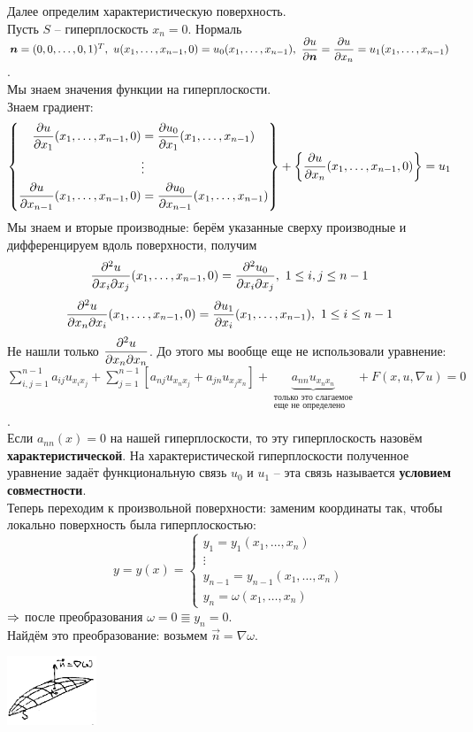 Далее определим характеристическую поверхность.\\
Пусть $S$ -- гиперплоскость $x_n = 0$. Нормаль $\boldsymbol{n} = (0,0,\dots,0, 1)^T,\ u(x_1, \dots, x_{n-1}, 0) = u_0(x_1, \dots, x_{n-1}),\ \dfrac{\partial u}{\partial\boldsymbol{n}} = \dfrac{\partial u}{\partial x_n} = u_1(x_1, \dots, x_{n-1}) $.\\
Мы знаем значения функции на гиперплоскости.\\
Знаем градиент:
\begin{equation*}
\left\{\begin{aligned}
\frac{\partial u}{\partial x_1}(x_1, \dots, x_{n-1}, 0) &= \frac{\partial u_0}{\partial x_1}(x_1, \dots, x_{n-1})\\ 
&\vdots \\
\frac{\partial u}{\partial x_{n-1}}(x_1, \dots, x_{n-1}, 0) &= \frac{\partial u_0}{\partial x_{n-1}}(x_1, \dots, x_{n-1})
\end{aligned} \right\}
+\left\{\frac{\partial u}{\partial x_n}(x_1,\dots,x_{n-1},0)\right\} = u_1
\end{equation*}
Мы знаем и вторые производные: берём указанные сверху производные и дифференцируем вдоль поверхности, получим \[\frac{\subd^2u}{\subd x_i\subd x_j}(x_1,\dots,x_{n-1}, 0) = \frac{\subd^2u_0}{\subd x_i\subd x_j},\ 1\le i,j \le n-1 \]
\[\frac{\partial^2u}{\partial x_n\partial x_i}(x_1,\dots,x_{n-1}, 0) = \frac{\partial u_1}{\partial x_i}(x_1,\dots,x_{n-1}),\ 1\le i\le n-1     \]
Не нашли только $\displaystyle\frac{\partial^2 u}{\partial x_n\partial x_n}$. До этого мы вообще еще не использовали уравнение:\\$\displaystyle\sum\limits_{i,j=1}^{n-1}a_{ij}u_{x_ix_j} + \displaystyle\sum\limits_{j=1}^{n-1}\left[a_{nj}u_{x_nx_j} + a_{jn}u_{x_jx_n}\right] + \underbrace{a_{nn}u_{x_nx_n}}_{\substack{\text{только это слагаемое}\\ \text{еще не определено}}} + F(x, u, \nabla u) = 0 $.\\
Если $a_{nn}(x) = 0$ на нашей гиперплоскости, то эту гиперплоскость назовём {\bf характеристической}. На характеристической гиперплоскости полученное уравнение задаёт функциональную связь $u_0$ и $u_1$ -- эта связь называется {\bf условием совместности}.\\
Теперь переходим к произвольной поверхности: заменим координаты так, чтобы локально поверхность была гиперплоскостью:\\
\[y = y(x) = \begin{cases} y_1 = y_1(x_1,\dots, x_n) \\ \vdots \\ y_{n-1} = y_{n-1}(x_1,\dots,x_n) \\ y_n = \omega(x_1,\dots,x_n) \end{cases} \]
$\Rightarrow$ после преобразования $\omega=0 \Equiv y_n=0$.\\
Найдём это преобразование: возьмем $\vec{n} = \nabla \omega$.
\begin{center}
\includegraphics[width=0.2\textwidth]{2_1_new}
\end{center}

